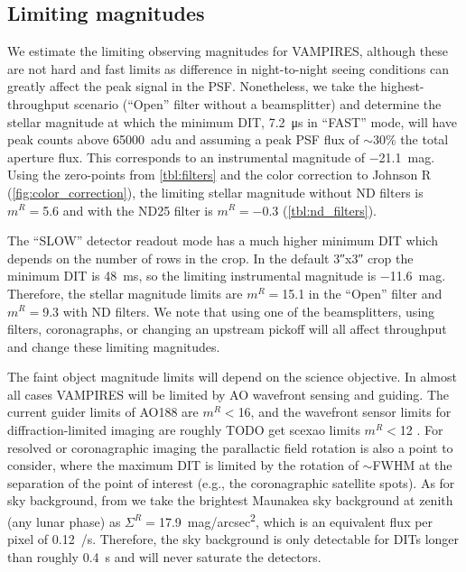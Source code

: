 \subsection{Limiting magnitudes}

We estimate the limiting observing magnitudes for VAMPIRES, although these are not hard and fast limits as difference in night-to-night seeing conditions can greatly affect the peak signal in the PSF. Nonetheless, we take the highest-throughput scenario (``Open'' filter without a beamsplitter) and determine the stellar magnitude at which the minimum DIT, \SI{7.2}{\micro\second} in ``FAST'' mode,  will have peak counts above \SI{65000}{adu} and assuming a peak PSF flux of $\sim$30\% the total aperture flux. This corresponds to an instrumental magnitude of \SI{-21.1}{mag}. Using the zero-points from \autoref{tbl:filters} and the color correction to Johnson R (\autoref{fig:color_correction}), the limiting stellar magnitude without ND filters is $m^R=$\num{5.6} and with the ND25 filter is $m^R=$\num{-0.3} (\autoref{tbl:nd_filters}).

The ``SLOW'' detector readout mode has a much higher minimum DIT which depends on the number of rows in the crop. In the default \ang{;;3}x\ang{;;3} crop the minimum DIT is \SI{48}{\milli\second}, so the limiting instrumental magnitude is \SI{-11.6}{mag}. Therefore, the stellar magnitude limits are $m^R=$\num{15.1} in the ``Open'' filter and $m^R=$\num{9.3} with ND filters. We note that using one of the beamsplitters, using filters, coronagraphs, or changing an upstream pickoff will all affect throughput and change these limiting magnitudes.

The faint object magnitude limits will depend on the science objective. In almost all cases VAMPIRES will be limited by AO wavefront sensing and guiding. The current guider limits of AO188 are $m^R<$\num{16}, and the wavefront sensor limits for diffraction-limited imaging are roughly TODO get scexao limits $m^R<$\num{12} \citep{minowa_performance_2010}. For resolved or coronagraphic imaging the parallactic field rotation is also a point to consider, where the maximum DIT is limited by the rotation of $\sim$FWHM at the separation of the point of interest (e.g., the coronagraphic satellite spots). As for sky background, from \citet{roth_measurements_2016} we take the brightest Maunakea sky background at zenith (any lunar phase) as $\Sigma^R=$\SI{17.9}{mag/arcsec^2}, which is an equivalent flux per pixel of \SI{0.12}{\electron/\second}. Therefore, the sky background is only detectable for DITs longer than roughly \SI{0.4}{\second} and will never saturate the detectors.
